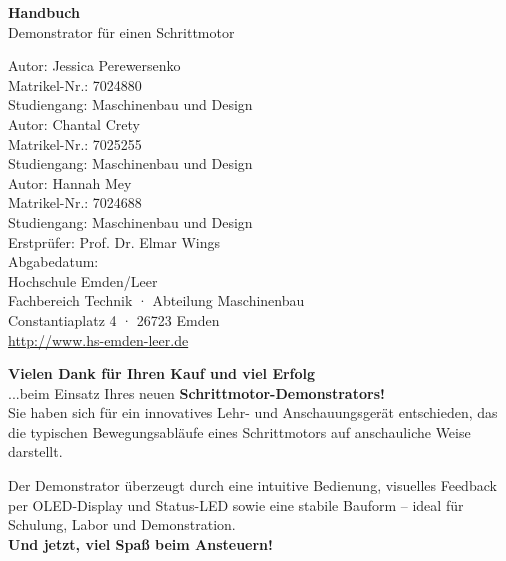 \documentclass[a4paper,12pt]{report}
\begin{document}
	
	\begin{titlepage}
		\centering
		\vspace*{2cm}
		{\Huge \textbf{Handbuch}}\\[1.5cm]
		{\LARGE Demonstrator für einen Schrittmotor}\\[4cm]
		\begin{flushleft}
			\large
			Autor: Jessica Perewersenko\\
			Matrikel-Nr.: 7024880\\
			Studiengang: Maschinenbau und Design\\[1cm]
			
			Autor: Chantal Crety\\
			Matrikel-Nr.: 7025255\\
			Studiengang: Maschinenbau und Design\\[1cm]
			
			Autor: Hannah Mey\\
			Matrikel-Nr.: 7024688\\
			Studiengang: Maschinenbau und Design\\[1.5cm]
			
			
			Erstprüfer: Prof. Dr. Elmar Wings\\
			Abgabedatum: \\[1.5cm]
			
			Hochschule Emden/Leer\\
			Fachbereich Technik · Abteilung Maschinenbau\\
			Constantiaplatz 4 · 26723 Emden\\
			\url{http://www.hs-emden-leer.de}
		\end{flushleft}
	\end{titlepage}
	
	\vspace*{\fill}
	\begin{center}
		\begin{tcolorbox}[
			colback=white!95!gray,
			colframe=black,
			width=0.9\textwidth,
			boxrule=0.5mm,
			arc=2mm,
			auto outer arc,
			drop shadow
			]
			\textbf{Vielen Dank für Ihren Kauf und viel Erfolg} \\
			...beim Einsatz Ihres neuen \textbf{Schrittmotor-Demonstrators!}\\[1em]
			
			Sie haben sich für ein innovatives Lehr- und Anschauungsgerät entschieden, das die typischen Bewegungsabläufe eines Schrittmotors auf anschauliche Weise darstellt.  
			
			Der Demonstrator überzeugt durch eine intuitive Bedienung, visuelles Feedback per OLED-Display und Status-LED sowie eine stabile Bauform – ideal für Schulung, Labor und Demonstration.\\
			
			\medskip
			\centering
			\textbf{Und jetzt, viel Spaß beim Ansteuern!}
		\end{tcolorbox}
	\end{center}
	\vspace*{\fill}
	
\end{document}
